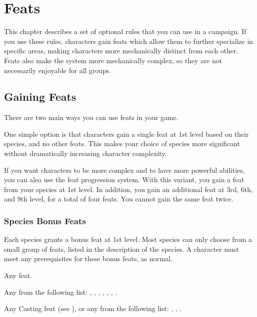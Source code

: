 \chapter{Feats}\label{Feats}

This chapter describes a set of optional rules that you can use in a campaign.
If you use these rules, characters gain feats which allow them to further specialize in specific areas, making characters more mechanically distinct from each other.
Feats also make the system more mechanically complex, so they are not necessarily enjoyable for all groups.

\section{Gaining Feats}
    There are two main ways you can use feats in your game.

    One simple option is that characters gain a single feat at 1st level based on their species, and no other feats.
    This makes your choice of species more significant without dramatically increasing character complexity.

    If you want characters to be more complex and to have more powerful abilities, you can also use the feat progression system.
    With this variant, you gain a feat from your species at 1st level.
    In addition, you gain an additional feat at 3rd, 6th, and 9th level, for a total of four feats.
    You cannot gain the same feat twice.

    \subsection{Species Bonus Feats}\label{Species Bonus Feats}
        Each species grants a bonus feat at 1st level. Most species can only choose from a small group of feats, listed in the description of the species. A character must meet any prerequisites for these bonus feats, as normal.

         Any feat.

         Any from the following list: , , , , , , .

         Any Casting feat (see ), or any from the following list: , , .

